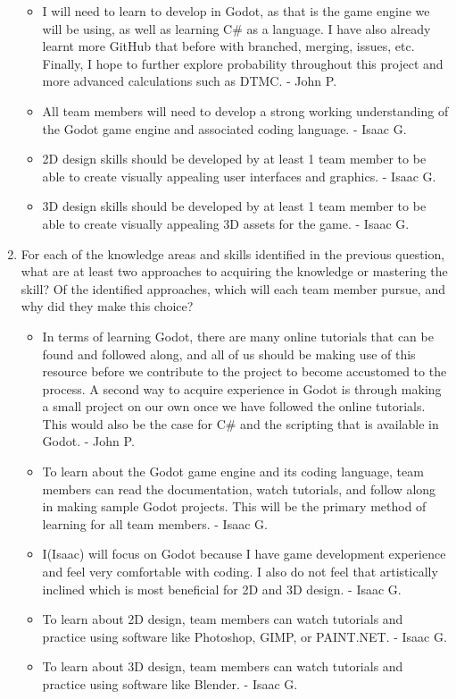 \begin{enumerate}
	\begin{itemize}
		\item I will need to learn to develop in Godot, as that is the game engine we will be using, as well as learning C\# as a language. I have also already learnt more GitHub that before with branched, merging, issues, etc. Finally, I hope to further explore probability throughout this project and more advanced calculations such as DTMC. - John P.
		\item All team members will need to develop a strong working understanding of the Godot game engine and associated coding language. - Isaac G.
    \item 2D design skills should be developed by at least 1 team member to be able to create visually appealing user interfaces and graphics. - Isaac G.
    \item 3D design skills should be developed by at least 1 team member to be able to create visually appealing 3D assets for the game. - Isaac G.
	\end{itemize}    
  
  \item For each of the knowledge areas and skills identified in the previous
  question, what are at least two approaches to acquiring the knowledge or
  mastering the skill?  Of the identified approaches, which will each team
  member pursue, and why did they make this choice?
  
	\begin{itemize}
		\item In terms of learning Godot, there are many online tutorials that can be found and followed along, and all of us should be making use of this resource before we contribute to the project to become accustomed to the process. A second way to acquire experience in Godot is through making a small project on our own once we have followed the online tutorials. This would also be the case for C\# and the scripting that is available in Godot. - John P.
		\item To learn about the Godot game engine and its coding language, team members can read the documentation, watch tutorials, and follow along in making sample Godot projects. This will be the primary method of learning for all team members. - Isaac G.
    \item I(Isaac) will focus on Godot because I have game development experience and feel very comfortable with coding. I also do not feel that artistically inclined which is most beneficial for 2D and 3D design. - Isaac G.
    \item To learn about 2D design, team members can watch tutorials and practice using software like Photoshop, GIMP, or PAINT.NET. - Isaac G.
    \item To learn about 3D design, team members can watch tutorials and practice using software like Blender. - Isaac G.
	\end{itemize}    
  
\end{enumerate}
